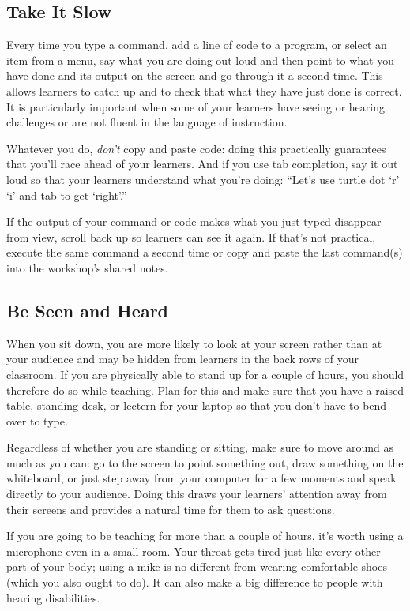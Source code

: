 \subsection*{Take It Slow}

Every time you type a command,
add a line of code to a program,
or select an item from a menu,
say what you are doing out loud
and then point to what you have done and its output on the screen
and go through it a second time.
This allows learners to catch up
and to check that what they have just done is correct.
It is particularly important when some of your learners have seeing or hearing challenges
or are not fluent in the language of instruction.

Whatever you do,
\emph{don't} copy and paste code:
doing this practically guarantees that you'll race ahead of your learners.
And if you use tab completion,
say it out loud so that your learners understand what you're doing:
``Let's use turtle dot `r' `i' and tab to get `right'.''

If the output of your command or code makes what you just typed disappear from view,
scroll back up so learners can see it again.
If that's not practical,
execute the same command a second time
or copy and paste the last command(s) into the workshop's shared notes.

\subsection*{Be Seen and Heard}

When you sit down,
you are more likely to look at your screen rather than at your audience
and may be hidden from learners in the back rows of your classroom.
If you are physically able to stand up for a couple of hours,
you should therefore do so while teaching.
Plan for this and make sure that you have a raised table,
standing desk,
or lectern
for your laptop
so that you don't have to bend over to type.

Regardless of whether you are standing or sitting,
make sure to move around as much as you can:
go to the screen to point something out,
draw something on the whiteboard,
or just step away from your computer for a few moments and speak directly to your audience.
Doing this draws your learners' attention away from their screens
and provides a natural time for them to ask questions.

If you are going to be teaching for more than a couple of hours,
it's worth using a microphone even in a small room.
Your throat gets tired just like every other part of your body;
using a mike is no different from wearing comfortable shoes
(which you also ought to do).
It can also make a big difference to people with hearing disabilities.

